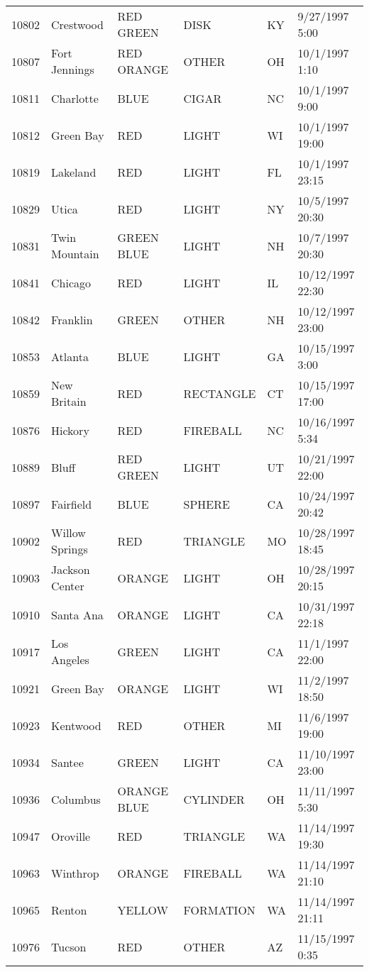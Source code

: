 \begin{tabular}{llllll}
10802 & Crestwood & RED GREEN & DISK & KY & 9/27/1997 5:00 \\
10807 & Fort Jennings & RED ORANGE & OTHER & OH & 10/1/1997 1:10 \\
10811 & Charlotte & BLUE & CIGAR & NC & 10/1/1997 9:00 \\
10812 & Green Bay & RED & LIGHT & WI & 10/1/1997 19:00 \\
10819 & Lakeland & RED & LIGHT & FL & 10/1/1997 23:15 \\
10829 & Utica & RED & LIGHT & NY & 10/5/1997 20:30 \\
10831 & Twin Mountain & GREEN BLUE & LIGHT & NH & 10/7/1997 20:30 \\
10841 & Chicago & RED & LIGHT & IL & 10/12/1997 22:30 \\
10842 & Franklin & GREEN & OTHER & NH & 10/12/1997 23:00 \\
10853 & Atlanta & BLUE & LIGHT & GA & 10/15/1997 3:00 \\
10859 & New Britain & RED & RECTANGLE & CT & 10/15/1997 17:00 \\
10876 & Hickory & RED & FIREBALL & NC & 10/16/1997 5:34 \\
10889 & Bluff & RED GREEN & LIGHT & UT & 10/21/1997 22:00 \\
10897 & Fairfield & BLUE & SPHERE & CA & 10/24/1997 20:42 \\
10902 & Willow Springs & RED & TRIANGLE & MO & 10/28/1997 18:45 \\
10903 & Jackson Center & ORANGE & LIGHT & OH & 10/28/1997 20:15 \\
10910 & Santa Ana & ORANGE & LIGHT & CA & 10/31/1997 22:18 \\
10917 & Los Angeles & GREEN & LIGHT & CA & 11/1/1997 22:00 \\
10921 & Green Bay & ORANGE & LIGHT & WI & 11/2/1997 18:50 \\
10923 & Kentwood & RED & OTHER & MI & 11/6/1997 19:00 \\
10934 & Santee & GREEN & LIGHT & CA & 11/10/1997 23:00 \\
10936 & Columbus & ORANGE BLUE & CYLINDER & OH & 11/11/1997 5:30 \\
10947 & Oroville & RED & TRIANGLE & WA & 11/14/1997 19:30 \\
10963 & Winthrop & ORANGE & FIREBALL & WA & 11/14/1997 21:10 \\
10965 & Renton & YELLOW & FORMATION & WA & 11/14/1997 21:11 \\
10976 & Tucson & RED & OTHER & AZ & 11/15/1997 0:35 \\

\end{tabular}
